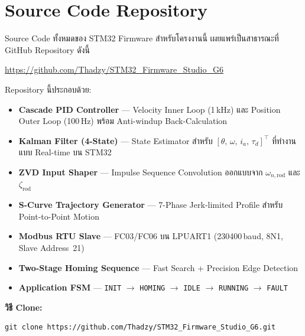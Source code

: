 
\chapter{Source Code Repository}
\label{app:code}

Source Code ทั้งหมดของ STM32 Firmware สำหรับโครงงานนี้
เผยแพร่เป็นสาธารณะที่ GitHub Repository ดังนี้

\begin{center}
    \large
    \url{https://github.com/Thadzy/STM32_Firmware_Studio_G6}
\end{center}

\vspace{1em}
\noindent Repository นี้ประกอบด้วย:

\begin{itemize}
    \item \textbf{Cascade PID Controller} --- Velocity Inner Loop (1\,kHz)
          และ Position Outer Loop (100\,Hz) พร้อม Anti-windup Back-Calculation
    \item \textbf{Kalman Filter (4-State)} --- State Estimator สำหรับ
          $[\theta,\,\omega,\,i_a,\,\tau_d]^\top$ ที่ทำงานแบบ Real-time บน STM32
    \item \textbf{ZVD Input Shaper} --- Impulse Sequence Convolution
          ออกแบบจาก $\omega_{n,\mathrm{rod}}$ และ $\zeta_\mathrm{rod}$
    \item \textbf{S-Curve Trajectory Generator} --- 7-Phase Jerk-limited Profile
          สำหรับ Point-to-Point Motion
    \item \textbf{Modbus RTU Slave} --- FC03/FC06 บน LPUART1 (230400\,baud, 8N1,
          Slave Address~21)
    \item \textbf{Two-Stage Homing Sequence} --- Fast Search + Precision Edge Detection
    \item \textbf{Application FSM} ---
          \texttt{INIT} $\to$ \texttt{HOMING} $\to$
          \texttt{IDLE} $\to$ \texttt{RUNNING} $\to$ \texttt{FAULT}
\end{itemize}

\vspace{1em}
\noindent\textbf{วิธี Clone:}

\begin{verbatim}
git clone https://github.com/Thadzy/STM32_Firmware_Studio_G6.git
\end{verbatim}

